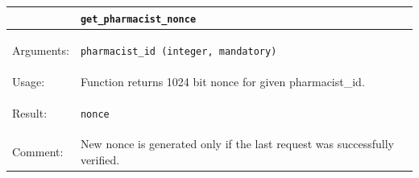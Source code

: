 \subsection{}


    \begin{longtable}{| p{3cm} | p{10.75cm} |}
    \hline
     & \texttt{get\_pharmacist\_nonce} \\ \hline
    Arguments: &  \begin{packed_enum}
    	\item \texttt{pharmacist\_id (integer, mandatory)}
	\end{packed_enum}     \\ \hline
    Usage: & Function returns 1024 bit nonce for given pharmacist\_id. \\ \hline
    Result: & \begin{packed_enum}
    	\item \texttt{nonce}
	\end{packed_enum}     \\ \hline	
			Comment: & New nonce is generated only if the last request was successfully verified.\\ \hline
    \end{longtable}


